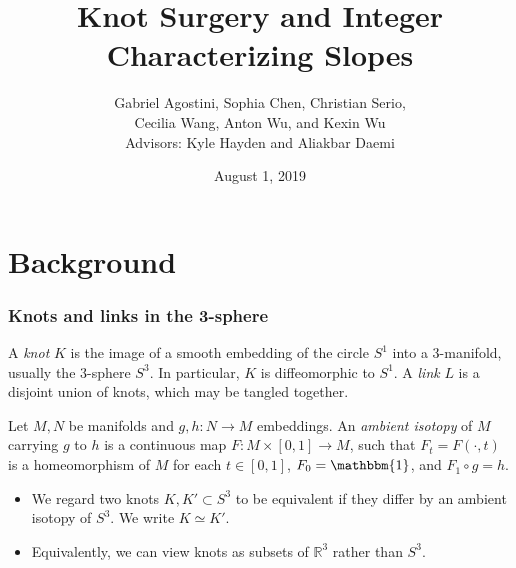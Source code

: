 \documentclass{beamer}
\title[Integer Characterizing Slopes]{Knot Surgery and Integer Characterizing Slopes}
\author[Agostini, Chen, Serio, Wang, Wu, and Wu\;\;\;]{Gabriel Agostini, Sophia Chen, Christian Serio,\\Cecilia Wang, Anton Wu, and Kexin Wu\\Advisors: Kyle Hayden and Aliakbar Daemi}
\institute{Columbia University}
\date{August 1, 2019}
\theoremstyle{ex}
\theoremstyle{rem}
\begin{document}
	
	\begin{frame}
		\titlepage
	\end{frame}

\section{Background}
	\begin{frame}
		\frametitle{Knots and links in the 3-sphere}
		\begin{definition}
			A \textit{knot} $K$ is the image of a smooth embedding of the circle $S^1$ into a 3-manifold, usually the $3$-sphere $S^3$. In particular, $K$ is diffeomorphic to $S^1$. A \textit{link} $L$ is a disjoint union of knots, which may be tangled together.
		\end{definition}
		\begin{definition}
		Let $M,N$ be manifolds and $g,h\!:N\to M$ embeddings. An \textit{ambient isotopy} of $M$ carrying $g$ to $h$ is a continuous map $F\!:M\times[0,1]\to M$, such that $F_t=F(\cdot,t)$ is a homeomorphism of $M$ for each $t\in[0,1]$,  $F_0=\mathbbm{1}$, and $F_1\circ g = h$.
		\end{definition}
		\begin{itemize}
		\item We regard two knots $K,K'\subset S^3$ to be equivalent if they differ by an ambient isotopy of $S^3$. We write $K\simeq K'$.	
		\item Equivalently, we can view knots as subsets of $\mathbb{R}^3$ rather than $S^3$.
		
		\end{itemize}
	\end{frame}
\end{document}

